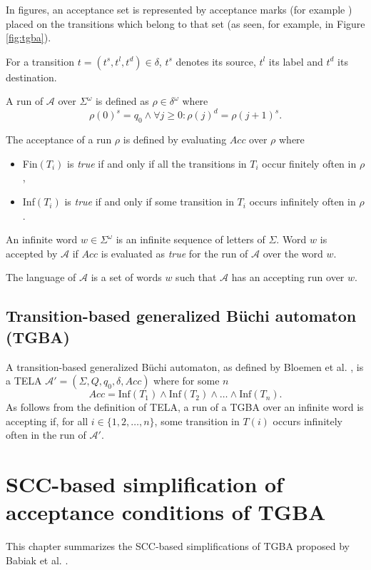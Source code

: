 \documentclass[
  digital, %
  twoside, %
  table,   %
  lof,     %
  lot,     %
]{fithesis3}
\begin{document}
In figures, an acceptance set is represented by acceptance marks (for example \accmarkblue) placed on the transitions which belong to that set (as seen, for example, in Figure \ref{fig:tgba}). 

For a transition $t = (t^s, t^l, t^d) \in \delta$, $t^s$ denotes its source, $t^l$ its label and $t^d$ its destination.

A run of $\mathcal{A}$ over $\Sigma^\omega$ is defined as $\rho \in \delta^\omega$ where 
\begin{equation*}
  \rho(0)^s = q_0 \wedge \forall j \geq 0 \colon \rho(j)^d = \rho(j + 1)^s.
\end{equation*}

The acceptance of a run $\rho$ is defined by evaluating $Acc$ over $\rho$ where
\begin{itemize}
  \item Fin$(T_i)$ is \emph{true} if and only if all the transitions in $T_i$ occur finitely often in $\rho$, 
  \item Inf$(T_i)$ is \emph{true} if and only if some transition in $T_i$ occurs infinitely often in $\rho$.
\end{itemize}

An infinite word $w \in \Sigma^\omega$ is an infinite sequence of letters of $\Sigma$. Word $w$ is accepted by $\mathcal{A}$ if $Acc$ is evaluated as \emph{true} for the run of $\mathcal{A}$ over the word $w$. 

The language of $\mathcal{A}$ is a set of words $w$ such that $\mathcal{A}$ has an accepting run over $w$.

\section{Transition-based generalized Büchi automaton (TGBA)}
\label{sec:tgba}
A transition-based generalized Büchi automaton, as defined by Bloemen et al. \cite{bloemen2017}, is a TELA $\mathcal{A'} = (\Sigma, Q, q_0, \delta, Acc)$ where for some $n$
\begin{equation*}
  Acc = \text{Inf}(T_1) \wedge \text{Inf}(T_2) \wedge \dots \wedge \text{Inf}(T_n).
\end{equation*} 
As follows from the definition of TELA, a run of a TGBA over an infinite word is accepting if, for all $i \in \{1, 2, \dots, n\}$, some transition in $T(i)$ occurs infinitely often in the run of $\mathcal{A'}$. 

\chapter{SCC-based simplification of acceptance conditions of TGBA} 
\label{chap:tgba_simpl}
This chapter summarizes the SCC-based simplifications of TGBA proposed by Babiak et al. \cite{spin2013}.
\end{document}

